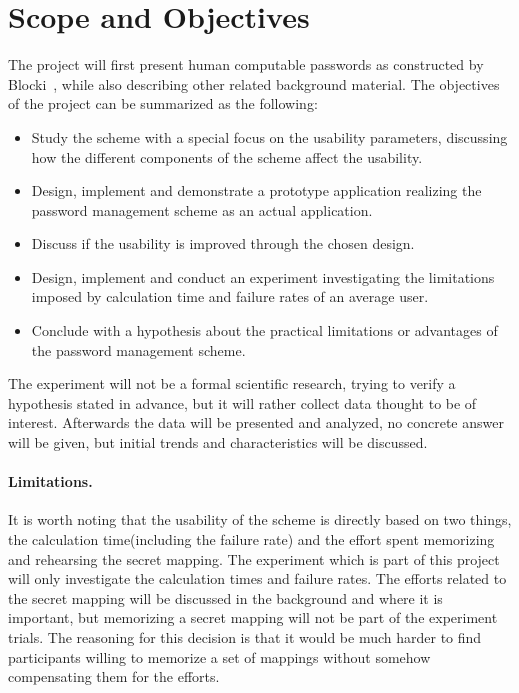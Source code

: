 
\section{Scope and Objectives}
The project will first present human computable passwords as constructed by Blocki~\cite{hcp-blocki}, while also describing other related background material. The objectives of the project can be summarized as the following:
\begin{itemize}
    \item Study the scheme with a special focus on the usability parameters, discussing how the different components of the scheme affect the usability.
    \item Design, implement and demonstrate a prototype application realizing the password management scheme as an actual application.
    \item Discuss if the usability is improved through the chosen design. 
    \item Design, implement and conduct an experiment investigating the limitations imposed by calculation time and failure rates of an average user.
    \item Conclude with a hypothesis about the practical limitations or advantages of the password management scheme.
\end{itemize}
\par The experiment will not be a formal scientific research, trying to verify a hypothesis stated in advance, but it will rather collect data thought to be of interest. Afterwards the data will be presented and analyzed, no concrete answer will be given, but initial trends and characteristics will be discussed.
\paragraph{Limitations.}
It is worth noting that the usability of the scheme is directly based on two things, the calculation time(including the failure rate) and the effort spent memorizing and rehearsing the secret mapping. The experiment which is part of this project will only investigate the calculation times and failure rates. The efforts related to the secret mapping will be discussed in the background and where it is important, but memorizing a secret mapping will not be part of the experiment trials. The reasoning for this decision is that it would be much harder to find participants willing to memorize a set of mappings without somehow compensating them for the efforts.



